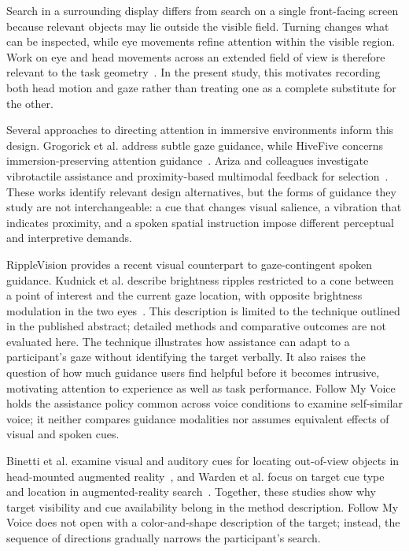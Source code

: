 Search in a surrounding display differs from search on a single front-facing screen because relevant objects may lie outside the visible field. Turning changes what can be inspected, while eye movements refine attention within the visible region. Work on eye and head movements across an extended field of view is therefore relevant to the task geometry~\cite{stein2024eyehead}. In the present study, this motivates recording both head motion and gaze rather than treating one as a complete substitute for the other.

Several approaches to directing attention in immersive environments inform this design. Grogorick et al. address subtle gaze guidance, while HiveFive concerns immersion-preserving attention guidance~\cite{grogorick2017subtle,lange2020hivefive}. Ariza and colleagues investigate vibrotactile assistance and proximity-based multimodal feedback for selection~\cite{ariza2017vibrotactile,ariza2018proximity}. These works identify relevant design alternatives, but the forms of guidance they study are not interchangeable: a cue that changes visual salience, a vibration that indicates proximity, and a spoken spatial instruction impose different perceptual and interpretive demands.

RippleVision provides a recent visual counterpart to gaze-contingent spoken guidance. Kudnick et al. describe brightness ripples restricted to a cone between a point of interest and the current gaze location, with opposite brightness modulation in the two eyes~\cite{kudnick2026ripplevision}. This description is limited to the technique outlined in the published abstract; detailed methods and comparative outcomes are not evaluated here. The technique illustrates how assistance can adapt to a participant's gaze without identifying the target verbally. It also raises the question of how much guidance users find helpful before it becomes intrusive, motivating attention to experience as well as task performance. Follow My Voice holds the assistance policy common across voice conditions to examine self-similar voice; it neither compares guidance modalities nor assumes equivalent effects of visual and spoken cues.

Binetti et al. examine visual and auditory cues for locating out-of-view objects in head-mounted augmented reality~\cite{binetti2021outofview}, and Warden et al. focus on target cue type and location in augmented-reality search~\cite{warden2022visual}. Together, these studies show why target visibility and cue availability belong in the method description. Follow My Voice does not open with a color-and-shape description of the target; instead, the sequence of directions gradually narrows the participant's search.

